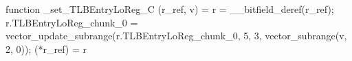 function _set_TLBEntryLoReg_C (r_ref, v) = {
    r = __bitfield_deref(r_ref);
    r.TLBEntryLoReg_chunk_0 = vector_update_subrange(r.TLBEntryLoReg_chunk_0, 5, 3, vector_subrange(v, 2, 0));
    (*r_ref) = r
}
